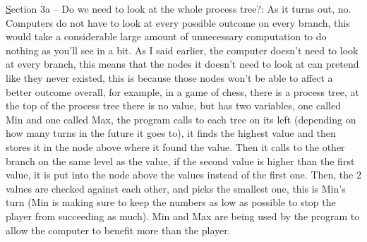 \documentclass{article}
\begin{document}
\par
\underline Section 3a – Do we need to look at the whole process tree?:
As it turns out, no. Computers do not have to look at every possible outcome on every branch, this would take a considerable large amount of unnecessary computation to do nothing as you’ll see in a bit. As I said earlier, the computer doesn’t need to look at every branch, this means that the nodes it doesn’t need to look at can pretend like they never existed, this is because those nodes won’t be able to affect a better outcome overall, for example, in a game of chess, there is a process tree, at the top of the process tree there is no value, but has two variables, one called Min and one called Max, the program calls to each tree on its left (depending on how many turns in the future it goes to), it finds the highest value and then stores it in the node above where it found the value. Then it calls to the other branch on the same level as the value, if the second value is higher than the first value, it is put into the node above the values instead of the first one. Then, the 2 values are checked against each other, and picks the smallest one, this is Min’s turn (Min is making sure to keep the numbers as low as possible to stop the player from succeeding as much). Min and Max are being used by the program to allow the computer to benefit more than the player.




\cite{knuth1975_alphabeta}
\cite{Simple_chess_AI}
\cite{Alpha_beta_pruning}
\end{document}
